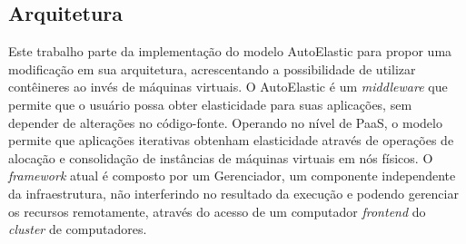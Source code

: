 \documentclass[twoside,english,brazilian]{UNISINOSartigo}
\begin{document}
\subsection{Arquitetura}
\label{arquitetura}
Este trabalho parte da implementação do modelo AutoElastic para propor uma modificação em sua arquitetura, acrescentando a possibilidade de utilizar contêineres ao invés de máquinas virtuais. O AutoElastic é um \textit{middleware} que permite que o usuário possa obter elasticidade para suas aplicações, sem depender de alterações no código-fonte. Operando no nível de PaaS, o modelo permite que aplicações iterativas obtenham elasticidade através de operações de alocação e consolidação de instâncias de máquinas virtuais em nós físicos. O \textit{framework} atual é composto por um Gerenciador, um componente independente da infraestrutura, não interferindo no resultado da execução e podendo gerenciar os recursos remotamente, através do acesso de um computador \textit{frontend} do \textit{cluster} de computadores.
\end{document}
